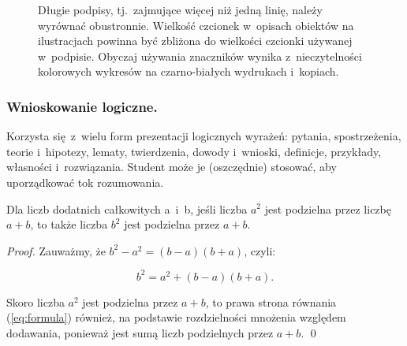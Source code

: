 \begin{figure}[!h]
	\vspace{-3mm}
	\centering
	\caption{Długie podpisy, tj.~zajmujące więcej niż jedną linię, należy wyrównać obustronnie. Wielkość czcionek w~opisach obiektów na ilustracjach powinna być zbliżona do wielkości czcionki używanej w~podpisie. Obyczaj używania znaczników wynika z~nieczytelności kolorowych wykresów na czarno-białych wydrukach i~kopiach.}
	\vspace{-6mm}
	\label{fig:compressionAlgorithms}
\end{figure}

\subsubsection{Wnioskowanie logiczne.}
\label{subsubsec:logic}

Korzysta się z~wielu form prezentacji logicznych wyrażeń: pytania, spostrzeżenia, teorie i~hipotezy, lematy, twierdzenia, dowody i~wnioski, definicje, przykłady, własności i~rozwiązania. Student może je (oszczędnie) stosować, aby uporządkować tok rozumowania.

\begin{claim}
	Dla liczb dodatnich całkowitych a~i~b, jeśli liczba $a^{2}$ jest podzielna przez liczbę $a+b$, to także liczba $b^{2}$ jest podzielna przez $a+b$.
\end{claim}
\begin{proof}
	Zauważmy, że $b^{2} - a^{2} = (b-a)(b+a)$, czyli:

	\begin{equation} \label{eq:formula}
		b^{2} = a^{2} + (b-a)(b+a).
	\end{equation}

	\noindent Skoro liczba $a^{2}$ jest podzielna przez $a+b$, to prawa strona równania (\ref{eq:formula}) również, na podstawie rozdzielności mnożenia względem dodawania, ponieważ jest sumą liczb podzielnych przez $a+b$. \qed
\end{proof}

